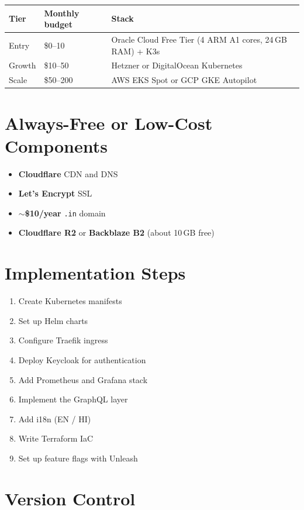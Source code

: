 \documentclass{article}
\begin{document}
\begin{center}
\begin{tabular}{@{}lll@{}}
\toprule
\textbf{Tier} & \textbf{Monthly budget} & \textbf{Stack} \\
\midrule
Entry & \$0--10 & Oracle Cloud Free Tier (4 ARM A1 cores, 24\,GB RAM) + K3s \\
Growth & \$10--50 & Hetzner or DigitalOcean Kubernetes \\
Scale & \$50--200 & AWS EKS Spot or GCP GKE Autopilot \\
\bottomrule
\end{tabular}
\end{center}

\section{Always-Free or Low-Cost Components}

\begin{itemize}[leftmargin=*]
  \item \textbf{Cloudflare} CDN and DNS
  \item \textbf{Let's Encrypt} SSL
  \item \textbf{$\sim$\$10/year} \texttt{.in} domain
  \item \textbf{Cloudflare R2} or \textbf{Backblaze B2} (about 10\,GB free)
\end{itemize}

\section{Implementation Steps}

\begin{enumerate}[leftmargin=*]
  \item Create Kubernetes manifests
  \item Set up Helm charts
  \item Configure Traefik ingress
  \item Deploy Keycloak for authentication
  \item Add Prometheus and Grafana stack
  \item Implement the GraphQL layer
  \item Add i18n (EN / HI)
  \item Write Terraform IaC
  \item Set up feature flags with Unleash
\end{enumerate}

\section{Version Control}
\end{document}
